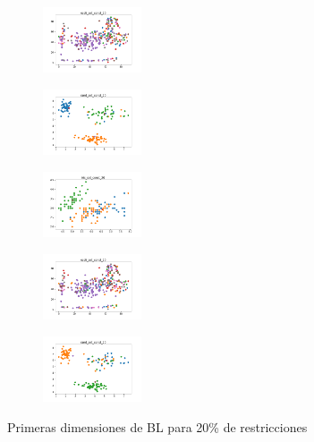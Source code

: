 \begin{figure}[H]
\begin{subfigure}
    \end{subfigure}
    \hfill
    \begin{subfigure}
        \centering
        \includegraphics[width=0.32\textwidth]{img/bl/ecoli_set_const_20_49258669_clust.png}
    \end{subfigure}
    \hfill
    \begin{subfigure}
        \centering
        \includegraphics[width=0.32\textwidth]{img/bl/rand_set_const_20_49258669_clust.png}
    \end{subfigure}
    \hfill
    \begin{subfigure}
        \centering
        \includegraphics[width=0.32\textwidth]{img/bl/iris_set_const_20_3773969821_clust.png}
    \end{subfigure}
    \hfill
    \begin{subfigure}
        \centering
        \includegraphics[width=0.32\textwidth]{img/bl/ecoli_set_const_20_3773969821_clust.png}
    \end{subfigure}
    \hfill
    \begin{subfigure}
        \centering
        \includegraphics[width=0.32\textwidth]{img/bl/rand_set_const_20_3773969821_clust.png}
    \end{subfigure}
    \caption{Primeras dimensiones de BL para 20\% de restricciones}
\end{figure}

